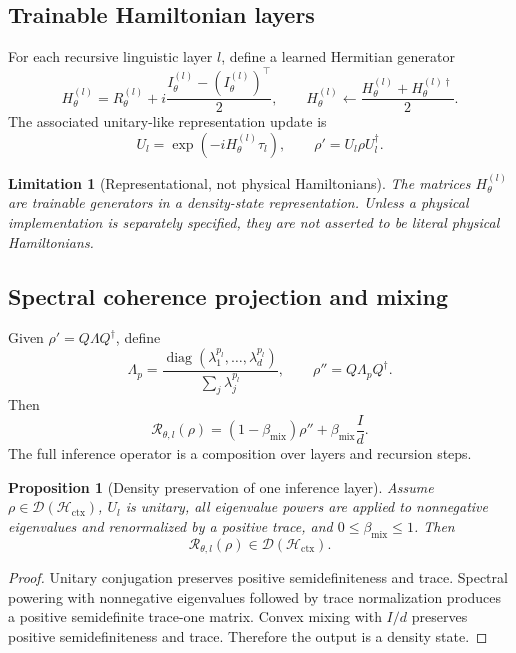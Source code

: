 \documentclass[11pt,a4paper]{article}
\newtheorem{proposition}[theorem]{Proposition}
\newtheorem{limitation}[theorem]{Limitation}
\newcommand{\D}{\mathcal D}
\newcommand{\Hcal}{\mathcal H}
\newcommand{\Rcal}{\mathcal R}
\newcommand{\ctx}{\mathrm{ctx}}
\newcommand{\mix}{\mathrm{mix}}
\newcommand{\diag}{\operatorname{diag}}
\begin{document}
\subsection{Trainable Hamiltonian layers}

For each recursive linguistic layer \(l\), define a learned Hermitian generator
\[
H_{\theta}^{(l)}=R_{\theta}^{(l)}+i\frac{I_{\theta}^{(l)}-(I_{\theta}^{(l)})^\top}{2},
\qquad
H_{\theta}^{(l)}\leftarrow\frac{H_{\theta}^{(l)}+H_{\theta}^{(l)\dagger}}{2}.
\]
The associated unitary-like representation update is
\[
U_l=\exp(-iH_{\theta}^{(l)}\tau_l),
\qquad
\rho'=U_l\rho U_l^\dagger.
\]

\begin{limitation}[Representational, not physical Hamiltonians]
The matrices \(H_{\theta}^{(l)}\) are trainable generators in a density-state representation. Unless a physical implementation is separately specified, they are not asserted to be literal physical Hamiltonians.
\end{limitation}

\subsection{Spectral coherence projection and mixing}

Given \(\rho'=Q\Lambda Q^\dagger\), define
\[
\Lambda_p=\frac{\diag(\lambda_1^{p_l},\ldots,\lambda_d^{p_l})}{\sum_j\lambda_j^{p_l}},
\qquad
\rho''=Q\Lambda_pQ^\dagger.
\]
Then
\[
\Rcal_{\theta,l}(\rho)=(1-\beta_{\mix})\rho''+\beta_{\mix}\frac{I}{d}.
\]
The full inference operator is a composition over layers and recursion steps.

\begin{proposition}[Density preservation of one inference layer]
Assume \(\rho\in\D(\Hcal_{\ctx})\), \(U_l\) is unitary, all eigenvalue powers are applied to nonnegative eigenvalues and renormalized by a positive trace, and \(0\le\beta_{\mix}\le1\). Then
\[
\Rcal_{\theta,l}(\rho)\in\D(\Hcal_{\ctx}).
\]
\end{proposition}

\begin{proof}
Unitary conjugation preserves positive semidefiniteness and trace. Spectral powering with nonnegative eigenvalues followed by trace normalization produces a positive semidefinite trace-one matrix. Convex mixing with \(I/d\) preserves positive semidefiniteness and trace. Therefore the output is a density state.
\end{proof}
\end{document}
